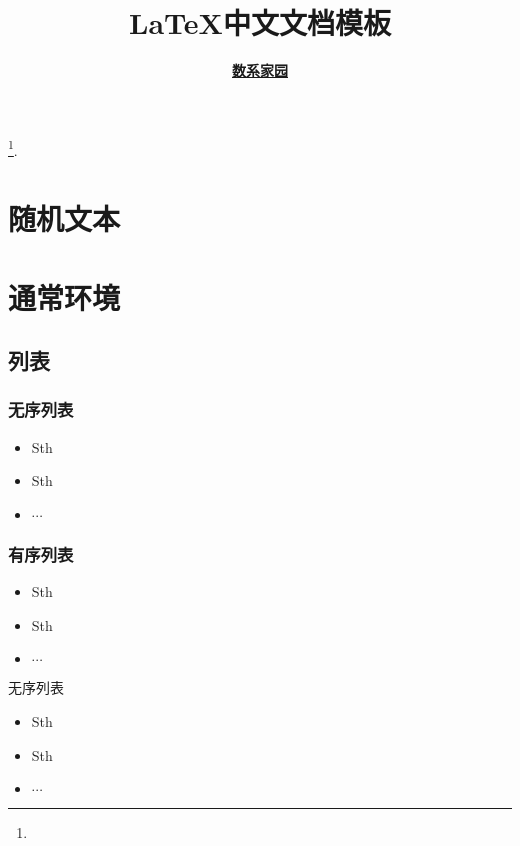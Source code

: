 \documentclass[a4paper, 12pt, UTF8]{ctexart}
\begin{document}
\title{\bf \LaTeX 中文文档模板}
\author{\bf
  \href{https://www.hustmatnoble.tk/2019/11/contact-me.html}{数系家园}}
\date{}

\maketitle
\tableofcontents
\footnote{\noindent {} \newline
  \updatetext{\today}}.

\clearpage
\listoflistings

\clearpage

\section{随机文本}
\zhlipsum[2-3]

\clearpage

\section{通常环境}

\subsection{列表}

\subsubsection{无序列表}
\begin{itemize}
    \item Sth
    \item Sth
    \item $\cdots$
\end{itemize}
\subsubsection{有序列表}
\begin{itemize}
    \item[(1)] Sth
    \item[(2)] Sth
    \item[(3)] $\cdots$
\end{itemize}
\begin{mybox}{无序列表}
    \begin{itemize}[leftmargin = 10pt]
        \item Sth
        \item Sth
        \item $\cdots$
    \end{itemize}
\end{mybox}
\end{document}
